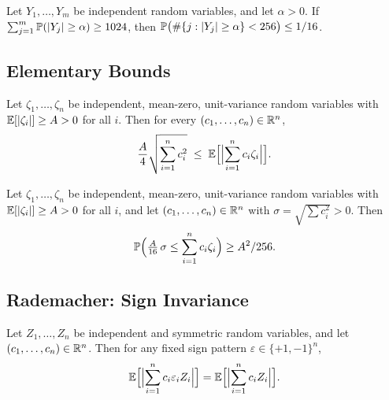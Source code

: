 \begin{theorem}\label{thm:chebyshev-active-app}
Let $Y_1, \dots, Y_m$ be independent random variables, and let $\alpha > 0$.
If $\sum_{j=1}^m \mathbb{P}(\lvert Y_j \rvert \ge \alpha) \ge 1024$, then
$\mathbb{P}\bigl(\#\{j : \lvert Y_j \rvert \ge \alpha\} < 256\bigr) \le 1/16$.
\end{theorem}

\subsection{Elementary Bounds}

\begin{theorem}%
\label{thm:finite-indep-l1-app}
Let $\zeta_1, \dots, \zeta_n$ be independent, mean-zero, unit-variance random
variables with $\mathbb{E}[\lvert \zeta_i \rvert] \ge A > 0$ for all $i$. Then for every
$(c_1, \dots, c_n) \in \mathbb{R}^n$,
\[
\frac{A}{4} \sqrt{\sum_{i=1}^n c_i^2}
\;\le\;
\mathbb{E}\Bigl[\Bigl\lvert \sum_{i=1}^n c_i \zeta_i \Bigr\rvert\Bigr].
\]
\end{theorem}

\begin{theorem}%
\label{thm:two-sided-mass-app}
Let $\zeta_1, \dots, \zeta_n$ be independent, mean-zero, unit-variance random
variables with $\mathbb{E}[\lvert \zeta_i \rvert] \ge A > 0$ for all $i$, and let
$(c_1, \dots, c_n) \in \mathbb{R}^n$ with $\sigma = \sqrt{\sum c_i^2} > 0$. Then
\[
\mathbb{P}\Bigl(\tfrac{A}{16} \, \sigma
  \le \sum_{i=1}^n c_i \zeta_i\Bigr)
\ge A^2/256.
\]
\end{theorem}

\subsection{Rademacher: Sign Invariance}

\begin{theorem}\label{thm:sign-flip-app}
Let $Z_1, \dots, Z_n$ be independent and symmetric random variables, and let
$(c_1, \dots, c_n) \in \mathbb{R}^n$. Then for any fixed sign pattern
$\varepsilon \in \{+1, -1\}^n$,
\[
\mathbb{E}\Bigl[\Bigl\lvert \sum_{i=1}^n c_i \varepsilon_i Z_i \Bigr\rvert\Bigr]
=
\mathbb{E}\Bigl[\Bigl\lvert \sum_{i=1}^n c_i Z_i \Bigr\rvert\Bigr].
\]
\end{theorem}

